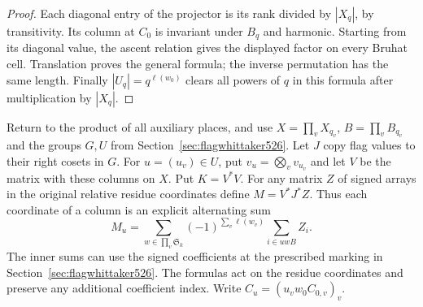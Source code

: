 \documentclass[a4paper,11pt]{article}
\theoremstyle{definition}
\theoremstyle{remark}
\numberwithin{equation}{section}
\begin{document}
\begin{proof}
Each diagonal entry of the projector is its rank divided by
\(|X_q|\), by transitivity. Its column at \(C_0\) is invariant
under \(B_q\) and harmonic. Starting from its diagonal value, the
ascent relation gives the displayed factor on every Bruhat cell.
Translation proves the general formula; the inverse permutation
has the same length. Finally \(|U_q|=q^{\ell(w_0)}\) clears all
powers of \(q\) in this formula after multiplication by \(|X_q|\).
\end{proof}

Return to the product of all auxiliary places, and use
\(X=\prod_v X_{q_v}\), \(B=\prod_v B_{q_v}\) and the groups
\(G,U\) from Section~\ref{sec:flagwhittaker526}.
Let \(J\) copy flag values to their right cosets in \(G\).
For \(u=(u_v)\in U\), put \(v_u=\bigotimes_v v_{u_v}\) and
let \(V\) be the matrix with these columns on \(X\). Put \(K=V^*V\).
For any matrix \(Z\) of signed arrays in the original relative
residue coordinates define \(M=V^*J^*Z\). Thus each coordinate of
a column is an explicit alternating sum
\[
 M_u=\sum_{w\in\prod_v\mathfrak S_k}
       (-1)^{\sum_v\ell(w_v)}\sum_{i\in u w B}Z_i .
\]
The inner sums can use the signed coefficients at the prescribed
marking in Section~\ref{sec:flagwhittaker526}. The formulas act
on the residue coordinates and preserve any additional coefficient
index. Write \(C_u=(u_v w_0 C_{0,v})_v\).
\end{document}
